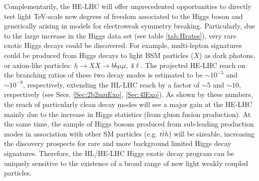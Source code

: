\documentclass[../report.tex]{subfiles}
\begin{document}
Complementarily, the HE-LHC will offer unprecedented opportunities to directly test light TeV-scale new degrees of freedom associated to the Higgs boson and generically arising in models for electroweak symmetry breaking. 
Particularly, due to the large increase in the Higgs data set (see table \ref{tab:Hrates}), very rare exotic Higgs decays could be discovered.
For example, multi-lepton signatures could be produced from Higgs decays to light BSM particles ($X$) as dark photons, or axion-like particles: $h \rightarrow XX \rightarrow b\overline{b}\mu\mu,~4\ell$. The projected HE-LHC reach on the branching ratios of these two decay modes is estimated to be $\sim10^{-5}$ and $\sim10^{-8}$, respectively, extending the HL-LHC reach by a factor of $\sim5$ and $\sim10$, respectively (see Secs. \ref{Sec:2b2muExo}, \ref{Sec:4lExo}). As shown by these numbers, the reach of particularly clean decay modes will see a major gain at the HE-LHC mainly due to the increase in Higgs statistics (from gluon fusion production). %
At the same time, the sample of Higgs bosons produced from sub-leading production
modes in association with other SM particles (e.g. $t\bar th$) will be sizeable, increasing the discovery prospects for rare and more background limited Higgs decay signatures. Therefore, the HL/HE-LHC
Higgs exotic decay program can be uniquely sensitive to the existence of a broad range of new light
weakly coupled particles.
\end{document}
